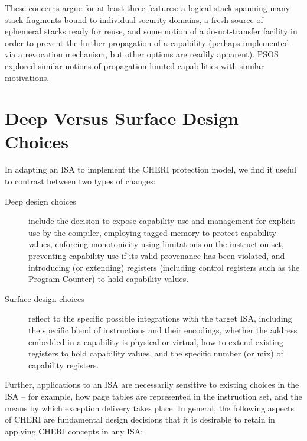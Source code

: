 These concerns argue for at least three features: a logical stack spanning many
stack fragments bound to individual security domains, a fresh source of ephemeral
stacks ready for reuse, and some notion of a do-not-transfer facility in order to
prevent the further propagation of a capability (perhaps implemented via a
revocation mechanism, but other options are readily apparent).  PSOS explored
similar notions of propagation-limited capabilities with similar motivations.

\section{Deep Versus Surface Design Choices}
\label{sec:deep-vs-surface}


In adapting an ISA to implement the CHERI protection model, we find it useful
to contrast between two types of changes:

\begin{description}
\item[Deep design choices] include the decision to expose capability use and
  management for explicit use by the compiler, employing tagged memory to
  protect capability values, enforcing monotonicity using limitations on the
  instruction set, preventing capability use if its valid provenance has been
  violated, and introducing (or extending) registers (including control
  registers such as the Program Counter) to hold capability values.

\item[Surface design choices] reflect to the specific possible integrations
  with the target ISA, including the specific blend of instructions and their
  encodings, whether the address embedded in a capability is physical or
  virtual, how to extend existing registers to hold capability values,
  and the specific number (or mix) of capability registers.
\end{description}

Further, applications to an ISA are necessarily sensitive to existing choices
in the ISA -- for example, how page tables are represented in the
instruction set, and the means by which exception delivery takes place.
In general, the following aspects of CHERI are fundamental design decisions
that it is desirable to retain in applying CHERI concepts in any ISA:

